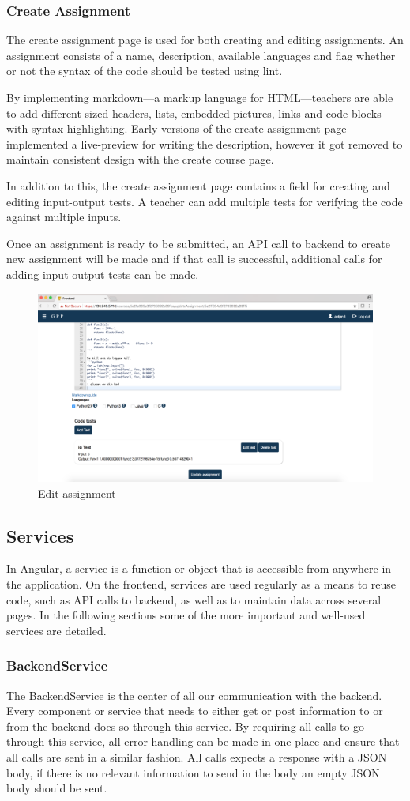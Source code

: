\subsubsection{Create Assignment}
The create assignment page is used for both creating and editing assignments. An assignment consists of a name, description, available languages and flag whether or not the syntax of the code should be tested using lint. 

By implementing markdown---a markup language for HTML---teachers are able to add different sized headers, lists, embedded pictures, links and code blocks with syntax highlighting. Early versions of the create assignment page implemented a live-preview for writing the description, however it got removed to maintain consistent design with the create course page. 

In addition to this, the create assignment page contains a field for creating and editing input-output tests. A teacher can add multiple tests for verifying the code against multiple inputs.

Once an assignment is ready to be submitted, an API call to backend to create new assignment will be made and if that call is successful, additional calls for adding input-output tests can be made. 
\begin{figure}[hb]
    \centering
    \includegraphics[width=.5\linewidth]{img/gppinpictures/editassignmenttests.png}
    \caption{Edit assignment}
\end{figure}

\subsection{Services}
In Angular, a service is a function or object that is accessible from anywhere in the application. On the frontend, services are used regularly as a means to reuse code, such as API calls to backend, as well as to maintain data across several pages. In the following sections some of the more important and well-used services are detailed.

\subsubsection{BackendService}
The BackendService is the center of all our communication with the backend. Every component or service that needs to either get or post information to or from the backend does so through this service. By requiring all calls to go through this service, all error handling can be made in one place and ensure that all calls are sent in a similar fashion. All calls expects a response with a JSON body, if there is no relevant information to send in the body an empty JSON body should be sent.

